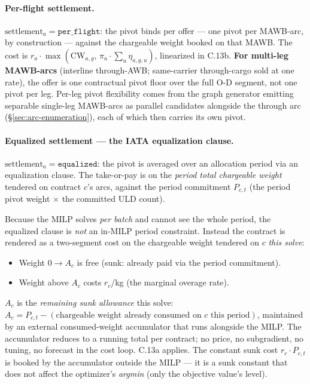 \documentclass[11pt,a4paper]{article}
\theoremstyle{definition}
\begin{document}
\paragraph{Per-flight settlement.}
$\text{settlement}_a = \texttt{per\_flight}$: the pivot binds per offer
--- one pivot per MAWB-arc, by construction --- against the chargeable
weight booked on that MAWB. The cost is $r_a \cdot \max(\text{CW}_{a,g},\,
\pi_a \cdot \sum_u \eta_{a,g,u})$, linearized in C.13b. \textbf{For
multi-leg MAWB-arcs} (interline through-AWB; same-carrier through-cargo
sold at one rate), the offer is one contractual pivot floor over the full
O-D segment, not one pivot per leg. Per-leg pivot flexibility comes from
the graph generator emitting separable single-leg MAWB-arcs as parallel
candidates alongside the through arc (\S\ref{sec:arc-enumeration}), each
of which then carries its own pivot.

\paragraph{Equalized settlement --- the IATA equalization clause.}
\label{sec:bsa-equalized-settlement}
$\text{settlement}_a = \texttt{equalized}$: the pivot is averaged over an
allocation period via an equalization clause. The take-or-pay is on the
\emph{period total chargeable weight} tendered on contract $c$'s arcs,
against the period commitment $P_{c,t}$ (the period pivot weight $\times$ the
committed ULD count).

Because the MILP solves \emph{per batch} and cannot see the whole period, the
equalized clause is \emph{not} an in-MILP period constraint. Instead the
contract is rendered as a two-segment cost on the chargeable weight tendered
on $c$ \emph{this solve}:
\begin{itemize}[noitemsep]
  \item Weight $0 \to A_c$ is free (sunk: already paid via the period
        commitment).
  \item Weight above $A_c$ costs $r_c$/kg (the marginal overage rate).
\end{itemize}
$A_c$ is the \emph{remaining sunk allowance} this solve: $A_c = P_{c,t} -
(\text{chargeable weight already consumed on $c$ this period})$, maintained
by an external consumed-weight accumulator that runs alongside the MILP. The
accumulator reduces to a running total per contract; no price, no
subgradient, no tuning, no forecast in the cost loop. C.13a applies. The
constant sunk cost $r_c \cdot P_{c,t}$ is booked by the accumulator outside
the MILP --- it is a sunk constant that does not affect the optimizer's
\emph{argmin} (only the objective value's level).
\end{document}
